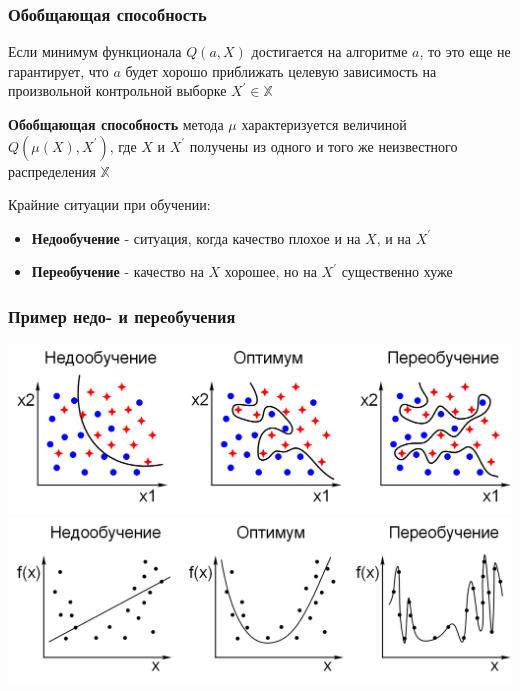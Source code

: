 \documentclass{beamer}
\begin{document}
	\begin{frame}
		\frametitle{Обобщающая способность}
		Если минимум функционала $Q(a, X)$ достигается на алгоритме $a$, то это еще не гарантирует, что $a$ будет хорошо приближать целевую зависимость на произвольной контрольной выборке $X^{'} \in \mathbb{X}$
		
		\vspace{15pt}
		
		\textbf{Обобщающая способность} метода $\mu$ характеризуется величиной $Q(\mu(X), X^{'})$, где $X$ и $X^{'}$ получены из одного и того же неизвестного распределения $\mathbb{X}$
		
		\vspace{15pt}
		
		Крайние ситуации при обучении:
		\begin{itemize}		
			\item \textbf{Недообучение} - ситуация, когда качество плохое и на $X$, и на $X^{'}$
			\item \textbf{Переобучение} - качество на $X$ хорошее, но на $X^{'}$ существенно хуже
		\end{itemize}
		
	\end{frame}

	
	\begin{frame}
		\frametitle{Пример недо- и переобучения}
		
		\includegraphics[width=\textwidth]{img/overfit1.png}
		\includegraphics[width=\textwidth]{img/overfit2.png}
	\end{frame}
\end{document}
